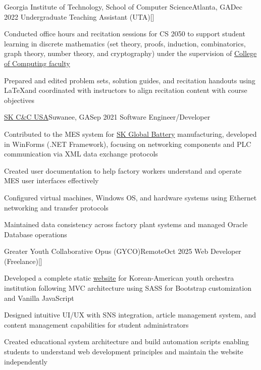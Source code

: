 \begin{resume-itemize}
  {Georgia Institute of Technology, School of Computer Science}{Atlanta, GA}{Dec 2022}
  {Undergraduate Teaching Assistant (UTA)}[\href{https://github.com/YundaeLeeSong/ydjs-references/tree/main/work2212-gt_compsci_ta}{}]
  \item Conducted office hours and recitation sessions for CS 2050 to support student learning in 
  discrete mathematics (set theory, proofs, induction, combinatorics, graph theory, number theory, and cryptography) 
  under the supervision of \href{https://www.cc.gatech.edu/people/faculty}{College of Computing faculty}
  \item Prepared and edited problem sets, solution guides, and recitation handouts using 
  \LaTeX and coordinated with instructors to align recitation content with course objectives
\end{resume-itemize}
\begin{resume-itemize}
  {\href{https://www.skaxus.com/}{SK C\&C USA}}{Suwanee, GA}{Sep 2021}
  {Software Engineer/Developer}
  \item Contributed to the MES system for \href{https://www.skbatteryamerica.com/}{SK Global Battery} 
  manufacturing, developed in WinForms (.NET Framework), focusing on networking 
  components and PLC communication via XML data exchange protocols
  \item Created user documentation to help factory workers understand and 
  operate MES user interfaces effectively
  \item Configured virtual machines, Windows OS, and hardware systems using 
  Ethernet networking and transfer protocols
  \item Maintained data consistency across factory plant systems and managed 
  Oracle Database operations
\end{resume-itemize}
\begin{resume-itemize}
  {Greater Youth Collaborative Opus (GYCO)}{Remote}{Oct 2025}
  {Web Developer (Freelance)}[\href{https://github.com/kate-yk/kate-yk.github.io}{}]
  \item Developed a complete static \href{https://kate-yk.github.io/index.html}{website} for Korean-American youth orchestra institution 
  following MVC architecture using SASS for Bootstrap customization and Vanilla JavaScript
  \item Designed intuitive UI/UX with SNS integration, article management system, 
  and content management capabilities for student administrators
  \item Created educational system architecture and build automation scripts
  enabling students to understand web development principles and maintain the website independently
\end{resume-itemize}
